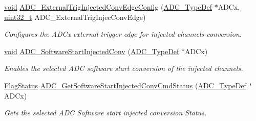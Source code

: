 \begin{DoxyCompactItemize}
\hyperlink{group___n_a_m_e_ga18028b8badbf1ea7e704ccac3c488e82}{void} \hyperlink{group___a_d_c___group6_ga62bea56579f04374fbe830d9e55e6fb0}{A\-D\-C\-\_\-\-External\-Trig\-Injected\-Conv\-Edge\-Config} (\hyperlink{struct_a_d_c___type_def}{A\-D\-C\-\_\-\-Type\-Def} $\ast$A\-D\-Cx, \hyperlink{stdint_8h_a435d1572bf3f880d55459d9805097f62}{uint32\-\_\-t} A\-D\-C\-\_\-\-External\-Trig\-Injec\-Conv\-Edge)
\begin{DoxyCompactList}\small\item\em Configures the A\-D\-Cx external trigger edge for injected channels conversion. \end{DoxyCompactList}\item 
\hyperlink{group___n_a_m_e_ga18028b8badbf1ea7e704ccac3c488e82}{void} \hyperlink{group___a_d_c___group6_ga79b2f6c3c77925b35495f2db228895de}{A\-D\-C\-\_\-\-Software\-Start\-Injected\-Conv} (\hyperlink{struct_a_d_c___type_def}{A\-D\-C\-\_\-\-Type\-Def} $\ast$A\-D\-Cx)
\begin{DoxyCompactList}\small\item\em Enables the selected A\-D\-C software start conversion of the injected channels. \end{DoxyCompactList}\item 
\hyperlink{group___exported__types_ga89136caac2e14c55151f527ac02daaff}{Flag\-Status} \hyperlink{group___a_d_c___group6_ga8765f8835b8cfed13dce3d8d71767dcc}{A\-D\-C\-\_\-\-Get\-Software\-Start\-Injected\-Conv\-Cmd\-Status} (\hyperlink{struct_a_d_c___type_def}{A\-D\-C\-\_\-\-Type\-Def} $\ast$A\-D\-Cx)
\begin{DoxyCompactList}\small\item\em Gets the selected A\-D\-C Software start injected conversion Status. \end{DoxyCompactList}\end{DoxyCompactItemize}


